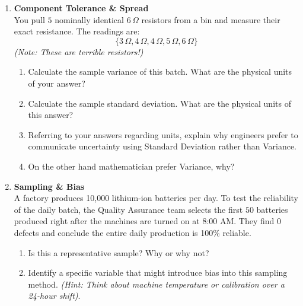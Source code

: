 \begin{enumerate}[label=\textbf{Q\arabic*.}, leftmargin=*, start=4]
    \item \textbf{Component Tolerance \& Spread} \\
    You pull $5$ nominally identical $6\,\Omega$ resistors from a bin and measure their exact resistance. The readings are: 
    \[ \{ 3\,\Omega, 4\,\Omega, 4\,\Omega, 5\,\Omega, 6\,\Omega \} \]
    \textit{(Note: These are terrible resistors!)}
    \begin{enumerate}[label=\arabic*.]
        \item Calculate the sample variance of this batch. What are the physical units of your answer?
        \item Calculate the sample standard deviation. What are the physical units of this answer?
        \item Referring to your answers regarding units, explain why engineers prefer to communicate uncertainty using Standard Deviation rather than Variance.
        \item On the other hand mathematician prefer Variance, why?
    \end{enumerate}
    \vspace{0.3cm}

    \item \textbf{Sampling \& Bias} \\
    A factory produces 10,000 lithium-ion batteries per day. To test the reliability of the daily batch, the Quality Assurance team selects the first $50$ batteries produced right after the machines are turned on at 8:00 AM. They find $0$ defects and conclude the entire daily production is 100\% reliable.
    \begin{enumerate}[label=\arabic*.]
        \item Is this a representative sample? Why or why not?
        \item Identify a specific variable that might introduce bias into this sampling method. \textit{(Hint: Think about machine temperature or calibration over a 24-hour shift)}.
    \end{enumerate}

\end{enumerate}




